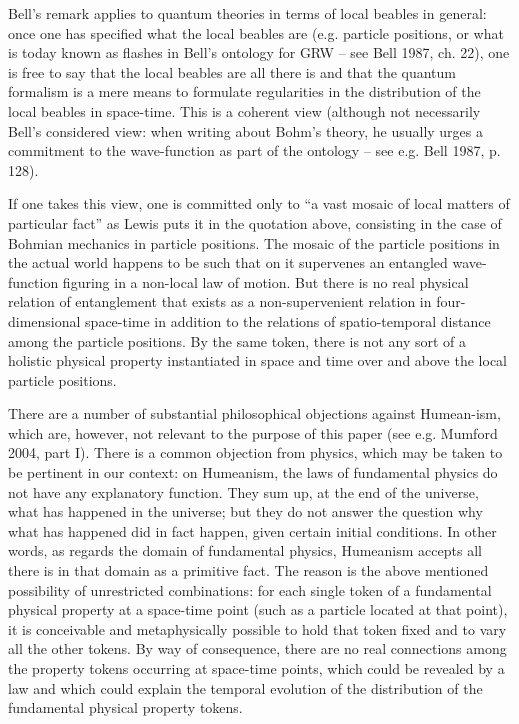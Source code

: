 \documentclass[12pt]{article}
\theoremstyle{definition}
\begin{document}
\noindent Bell's remark applies to quantum theories in terms of local beables in general: once one has specified what the local beables are (e.g. particle positions, or what is today known as flashes in Bell's ontology for GRW -- see Bell 1987, ch. 22), one is free to say that the local beables are all there is and that the quantum formalism is a mere means to formulate regularities in the distribution of the local beables in space-time. This is a coherent view (although not necessarily Bell's considered view: when writing about Bohm's theory, he usually urges a commitment to the wave-function as part of the ontology  -- see e.g. Bell 1987, p. 128).

If one takes this view, one is committed only to ``a vast mosaic of local matters of particular fact'' as Lewis puts it in the quotation above, consisting in the case of Bohmian mechanics in particle positions. The mosaic of the particle positions in the actual world happens to be such that on it supervenes an entangled wave-function figuring in a non-local law of motion. But there is no real physical relation of entanglement that exists as a non-supervenient relation in four-dimensional space-time in addition to the relations of spatio-temporal distance among the particle positions. By the same token, there is not any sort of a holistic physical property instantiated in space and time over and above the local particle positions.

There are a number of substantial philosophical objections against 
Humean-ism, which are, however, not relevant to the purpose of this paper (see e.g. Mumford 2004, part I). There is a common objection from physics, which may be taken to be pertinent in our context: on Humeanism, the laws of fundamental physics do not have any explanatory function. They sum up, at the end of the universe, what has happened in the universe; but they do not answer the question why what has happened did in fact happen, given certain initial conditions. In other words, as regards the domain of fundamental physics, Humeanism accepts all there is in that domain as a primitive fact. The reason is the above mentioned possibility of unrestricted combinations: for each single token of a fundamental physical property at a space-time point (such as a particle located at that point), it is conceivable and metaphysically possible to hold that token fixed and to vary all the other tokens. By way of consequence, there are no real connections among the property tokens occurring at space-time points, which could be revealed by a law and which could explain the temporal evolution of the distribution of the fundamental physical property tokens.
\end{document}
